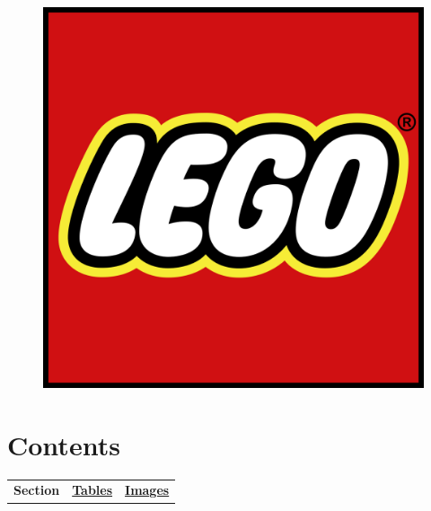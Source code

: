 \documentclass[12pt]{article}
\begin{document}
\thispagestyle{empty}

\quad\vspace{4cm}
\begin{figure}[h]\begin{center}
	\includegraphics[width = 12cm]{lego.png}
	\label{fig:title}
\end{center}\end{figure}

\newpage
{}
\setlength{\tabcolsep}{0pt}

\section*{\centering Contents\label{contents}}
\begin{center}\begin{tabular}{p{200pt} >{\raggedleft\arraybackslash}p{63pt} >{\raggedleft\arraybackslash}p{79pt}}
	\textbf{Section} & \hyperref[tables]{\textbf{Tables}} & \hyperref[images]{\textbf{Images}}\\
\end{tabular}
\begin{tabular}{p{250pt} >{\raggedleft\arraybackslash}p{13pt} p{66pt} >{\raggedleft\arraybackslash}p{13pt}}
	
\end{tabular}\end{center}

\setlength{\tabcolsep}{6pt}

\newpage
\label{tables}


\newpage
\label{images}

\end{document}
